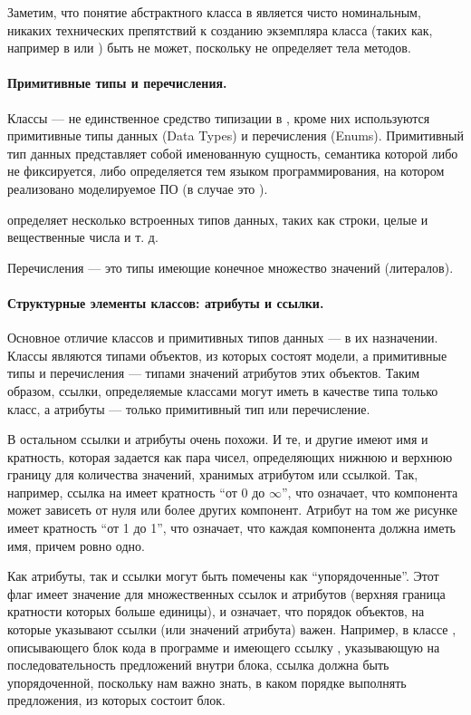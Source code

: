 Заметим, что понятие абстрактного класса в  является чисто номинальным, никаких технических препятствий к созданию экземпляра класса (таких как, например в  или ) быть не может, поскольку  не определяет тела методов. 

\paragraph*{Примитивные типы и перечисления.} Классы --- не единственное средство типизации в , кроме них используются примитивные типы данных (Data Types) и перечисления (Enums). Примитивный тип данных представляет собой именованную сущность, семантика которой либо не фиксируется, либо определяется тем языком программирования, на котором реализовано моделируемое ПО (в случае  это ). 

 определяет несколько встроенных типов данных, таких как строки, целые и вещественные числа и т. д.

Перечисления --- это типы имеющие конечное множество значений (литералов).

\paragraph*{Структурные элементы классов: атрибуты и ссылки.} Основное отличие классов и примитивных типов данных --- в их назначении. Классы являются типами объектов, из которых состоят модели, а примитивные типы и перечисления --- типами значений атрибутов этих объектов. Таким образом, ссылки, определяемые классами могут иметь в качестве типа только класс, а атрибуты --- только примитивный тип или перечисление.

В остальном ссылки и атрибуты очень похожи. И те, и другие имеют имя и кратность, которая задается как пара чисел, определяющих нижнюю и верхнюю границу для количества значений, хранимых атрибутом или ссылкой. Так, например, ссылка  на  имеет кратность ``от 0 до $\infty$'', что означает, что компонента может зависеть от нуля или более других компонент. Атрибут  на том же рисунке имеет кратность ``от 1 до 1'', что означает, что каждая компонента должна иметь имя, причем ровно одно.

Как атрибуты, так и ссылки могут быть помечены как ``упорядоченные''. Этот флаг имеет значение для множественных ссылок и атрибутов (верхняя граница кратности которых больше единицы), и означает, что порядок объектов, на которые указывают ссылки (или значений атрибута) важен. Например, в классе , описывающего блок кода в программе и имеющего ссылку , указывающую на последовательность предложений внутри блока, ссылка  должна быть упорядоченной, поскольку нам важно знать, в каком порядке выполнять предложения, из которых состоит блок.

